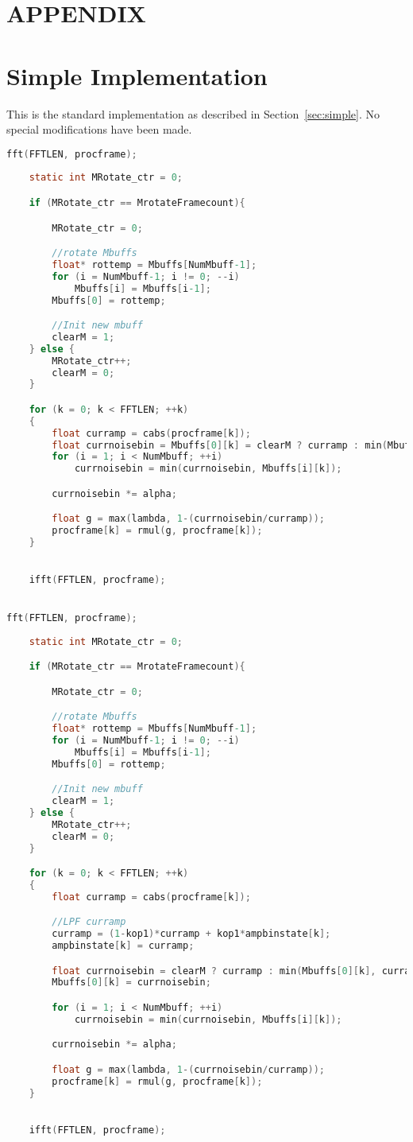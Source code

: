 \documentclass[11pt]{article} %
\begin{document}
\section{APPENDIX} 
\appendix
\section{Simple Implementation} 
\label{app:simple}

This is the standard implementation as described in Section~\ref{sec:simple}. No special modifications have been made. 
  \begin{center}
    \begin{lstlisting}[language = C]
fft(FFTLEN, procframe);
									
    static int MRotate_ctr = 0;

	if (MRotate_ctr == MrotateFramecount){

		MRotate_ctr = 0;

		//rotate Mbuffs
		float* rottemp = Mbuffs[NumMbuff-1];
		for (i = NumMbuff-1; i != 0; --i)
			Mbuffs[i] = Mbuffs[i-1];
		Mbuffs[0] = rottemp;

		//Init new mbuff
		clearM = 1;
	} else {
		MRotate_ctr++;
		clearM = 0;
	}

	for (k = 0; k < FFTLEN; ++k)
	{
		float curramp = cabs(procframe[k]); 
		float currnoisebin = Mbuffs[0][k] = clearM ? curramp : min(Mbuffs[0][k], curramp);
		for (i = 1; i < NumMbuff; ++i)
			currnoisebin = min(currnoisebin, Mbuffs[i][k]);

		currnoisebin *= alpha;

		float g = max(lambda, 1-(currnoisebin/curramp));
		procframe[k] = rmul(g, procframe[k]);
	}

	
	ifft(FFTLEN, procframe);


fft(FFTLEN, procframe);
									
    static int MRotate_ctr = 0;

	if (MRotate_ctr == MrotateFramecount){

		MRotate_ctr = 0;

		//rotate Mbuffs
		float* rottemp = Mbuffs[NumMbuff-1];
		for (i = NumMbuff-1; i != 0; --i)
			Mbuffs[i] = Mbuffs[i-1];
		Mbuffs[0] = rottemp;

		//Init new mbuff
		clearM = 1;
	} else {
		MRotate_ctr++;
		clearM = 0;
	}

	for (k = 0; k < FFTLEN; ++k)
	{
		float curramp = cabs(procframe[k]); 

		//LPF curramp
		curramp = (1-kop1)*curramp + kop1*ampbinstate[k];
		ampbinstate[k] = curramp;

		float currnoisebin = clearM ? curramp : min(Mbuffs[0][k], curramp);
		Mbuffs[0][k] = currnoisebin;

		for (i = 1; i < NumMbuff; ++i)
			currnoisebin = min(currnoisebin, Mbuffs[i][k]);

		currnoisebin *= alpha;

		float g = max(lambda, 1-(currnoisebin/curramp));
		procframe[k] = rmul(g, procframe[k]);
	}

	
	ifft(FFTLEN, procframe);
    \end{lstlisting}
  \end{center}
\end{document}
